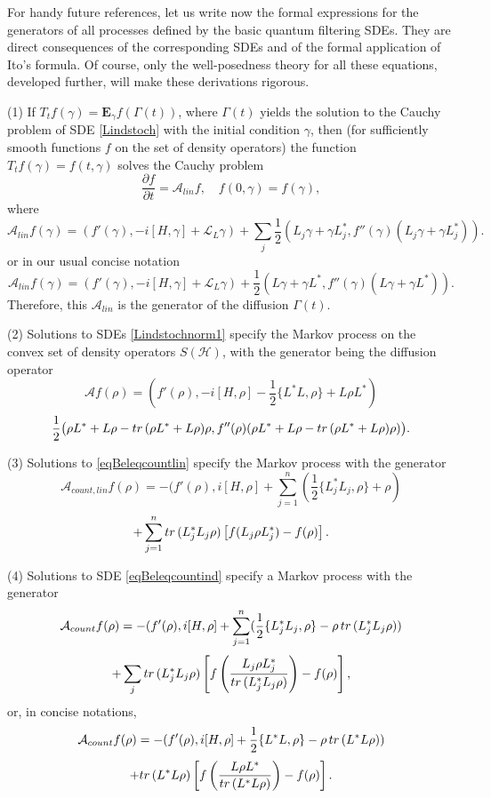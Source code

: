 \documentclass[10pt,a4paper]{amsart}
\def\AC{\mathcal{A}}
\def\LC{\mathcal{L}}
\def\HC{\mathcal{H}}
\def\E{\mathbf{E}}
\def\tr{\rm{tr}}
\def\pa{\partial}
\def\ga{\gamma}
\newcommand{\Ga}{\Gamma}
\begin{document}
For handy future references, let us write now the formal expressions for the generators of all processes
defined by the basic quantum filtering SDEs. They are direct consequences of the corresponding SDEs
and of the formal application of Ito's formula. Of course, only the well-posedness theory for all these equations,
developed further, will make these derivations rigorous.

(1) If $T_tf(\ga)=\E_{\ga} f(\Ga(t))$, where $\Ga(t)$ yields the solution
to the Cauchy problem of SDE \eqref{Lindstoch} with the initial condition $\ga$,
then (for sufficiently smooth functions $f$ on the set of density operators)
the function $T_tf(\ga)=f(t,\ga)$ solves the Cauchy problem
\begin{equation}
\label{eqCauchylinfilt}
\frac{\pa f}{\pa t}=\AC_{lin} f, \quad f(0,\ga)=f(\ga),
\end{equation}
where
\begin{equation}
\label{eqgenlinfilt1}
\AC_{lin} f(\ga)= (f'(\ga), -i[H,\ga] +\LC_L \ga) + \sum_j \frac12 (L_j\ga+\ga L_j^*, f''(\ga) (L_j\ga+\ga L_j^*)).
\end{equation}
or in our usual concise notation
\begin{equation}
\label{eqgenlinfilt}
\AC_{lin} f(\ga)= (f'(\ga), -i[H,\ga] +\LC_L \ga) + \frac12 (L\ga+\ga L^*, f''(\ga) (L\ga+\ga L^*)).
\end{equation}
Therefore, this $\AC_{lin}$ is the generator of the diffusion $\Ga(t)$.

(2) Solutions to SDEs  \eqref{Lindstochnorm1} specify the Markov process on the convex
set of density operators  $S(\HC)$, with the generator
being the diffusion operator
\[
\AC f(\rho)=(f'(\rho),-i[H, \rho] -\frac12 \{L^*L,\rho\}+ L\rho L^*)
\]
\begin{equation}
\label{eqdifgener}
\frac12 \bigl(\rho L^* + L\rho-{\tr}\,(\rho L^* +L\rho)  \rho,
f''(\rho) (\rho L^* + L\rho-{\tr}\,(\rho L^* +L\rho)  \rho)\bigr).
\end{equation}

(3) Solutions to \eqref{eqBeleqcountlin} specify the Markov process with the generator
\[
\AC_{count,lin}f(\rho)=-(f'(\rho), i[H, \rho]
+\sum_{j=1}^n \left(\frac12 \{L_j^*L_j,\rho\}+ \rho\right)
\]
 \begin{equation}
\label{eqjumpgenerlin}
+ \sum_{j=1}^n {\tr}\, (L_j^*L_j\rho)\left[f(L_j\rho L_j^*)-f(\rho)\right].
\end{equation}

(4) Solutions to SDE \eqref{eqBeleqcountind}
specify a Markov process with the generator
\[
\AC_{count}f(\rho)=-(f'(\rho), i[H, \rho] +\sum_{j=1}^n (\frac12 \{L_j^*L_j,\rho\}-\rho \, {\tr}\, (L_j^*L_j\rho))
\]
\begin{equation}
\label{eqjumpgenerj}
+\sum_j {\tr}\, (L_j^*L_j\rho) \left[f\left(\frac{L_j\rho L_j^*}{{\tr}\, (L_j^*L_j\rho)}\right)-f(\rho)\right],
\end{equation}
or, in concise notations,
 \[
\AC_{count}f(\rho)=-(f'(\rho), i[H, \rho] + \frac12 \{L^*L,\rho\}-\rho \, {\tr}\, (L^*L\rho))
\]
 \begin{equation}
\label{eqjumpgener}
+ {\tr}\, (L^*L\rho)\left[f\left(\frac{L\rho L^*}{{\tr}\, (L^*L\rho)}\right)-f(\rho)\right].
\end{equation}
\end{document}
